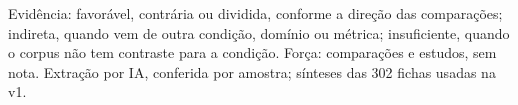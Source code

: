 \begin{table}[!tp]
\begin{tabular}{p{0.55cm}p{2.0cm}p{2.4cm}p{1.9cm}p{5.6cm}p{1.6cm}p{3.1cm}}
\hline
\end{tabular}
\par\smallskip
\parbox{\textwidth}{\scriptsize Evidência: favorável, contrária ou dividida, conforme a direção das comparações; indireta, quando vem de outra condição, domínio ou métrica; insuficiente, quando o corpus não tem contraste para a condição. Força: comparações e estudos, sem nota. Extração por IA, conferida por amostra; sínteses das 302 fichas usadas na v1.}
\end{table}
